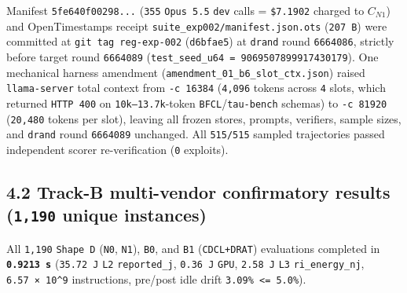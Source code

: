\documentclass[10pt,letterpaper]{article}
\begin{document}
Manifest \texttt{5fe640f00298.\allowbreak{}.\allowbreak{}.\allowbreak{}} (\texttt{355} \texttt{Opus\ 5.5}
\texttt{dev} calls = \texttt{\$7.1902} charged to \(C_{N1}\)) and
OpenTimestamps receipt \texttt{suite\_\allowbreak{}exp002/\allowbreak{}manifest.\allowbreak{}json.\allowbreak{}ots}
(\texttt{207\ B}) were committed at \texttt{git\ tag\ reg-\allowbreak{}exp-\allowbreak{}002}
(\texttt{d6bfae5}) at \texttt{drand} round \texttt{6664086}, strictly
before target round \texttt{6664089}
(\texttt{test\_\allowbreak{}seed\_\allowbreak{}u64\ =\ 90695078\allowbreak{}99917430179}). One mechanical
harness amendment (\texttt{amendment\_\allowbreak{}01\_\allowbreak{}b6\_\allowbreak{}slot\_\allowbreak{}ctx.\allowbreak{}json}) raised
\texttt{llama-\allowbreak{}server} total context from \texttt{-c\ 16384}
(\texttt{4,096} tokens across \texttt{4} slots, which returned
\texttt{HTTP\ 400} on \texttt{10k–13.7k}-token
\texttt{BFCL}/\allowbreak{}\texttt{tau-bench} schemas) to \texttt{-c\ 81920}
(\texttt{20,480} tokens per slot), leaving all frozen stores, prompts,
verifiers, sample sizes, and \texttt{drand} round \texttt{6664089}
unchanged. All \texttt{515/515} sampled trajectories passed independent
scorer re-verification (\texttt{0} exploits).

\subsection{\texorpdfstring{4.2 Track-B multi-vendor confirmatory
results (\texttt{1,190} unique
instances)}{4.2 Track-B multi-vendor confirmatory results (1,190 unique instances)}}\label{track-b-multi-vendor-confirmatory-results-1190-unique-instances}

All \texttt{1,190} \texttt{Shape\ D} (\texttt{N0}, \texttt{N1}),
\texttt{B0}, and \texttt{B1} (\texttt{CDCL+DRAT}) evaluations completed
in \textbf{\texttt{0.9213\ s}} (\texttt{35.72\ J} \texttt{L2}
\texttt{reported\_\allowbreak{}j}, \texttt{0.36\ J} \texttt{GPU}, \texttt{2.58\ J}
\texttt{L3} \texttt{ri\_\allowbreak{}energy\_\allowbreak{}nj}, \texttt{6.57\ ×\ 10\^{}9}
instructions, pre/post idle drift \texttt{3.09\%\ \textless{}=\ 5.0\%}).
\end{document}
